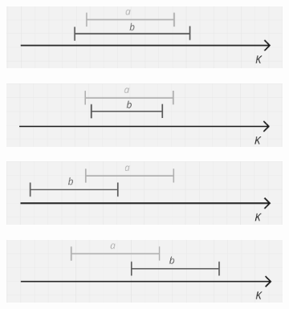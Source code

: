 \begin{itemize}
\begin{figure}[H]
    \centering

    \begin{subfigure}{0.75\linewidth}
        \centering
        \includegraphics[width=\linewidth]{figures/Optimazaciones/Interseccion/crit sol 11 1.png}
        \caption{}
        \label{fig:crit-solapamiento-a}
    \end{subfigure}
    
    \vspace{0.4cm}

    \begin{subfigure}{0.75\linewidth}
        \centering
        \includegraphics[width=\linewidth]{figures/Optimazaciones/Interseccion/crit sol 11 2.png}
        \caption{}
        \label{fig:crit-solapamiento-b}
    \end{subfigure}
    
    \vspace{0.4cm}

    \begin{subfigure}{0.75\linewidth}
        \centering
        \includegraphics[width=\linewidth]{figures/Optimazaciones/Interseccion/crit sol 11 3.png}
        \caption{}
        \label{fig:crit-solapamiento-c}
    \end{subfigure}
    
    \vspace{0.4cm}

    \begin{subfigure}{0.75\linewidth}
        \centering
        \includegraphics[width=\linewidth]{figures/Optimazaciones/Interseccion/crit sol 11 4.png}
        \caption{}
        \label{fig:crit-solapamiento-d}
    \end{subfigure}


\end{figure}
\end{itemize}
